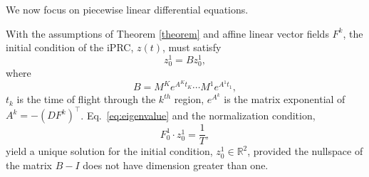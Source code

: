 \documentclass[12pt]{article}
\begin{document}
We now focus on piecewise linear differential equations.


\begin{corollary}
With the assumptions of Theorem \ref{theorem} and affine linear vector fields $F^k$, the initial condition of the iPRC, $z(t)$, must satisfy
 \begin{equation}\label{eq:eigenvalue}
z^1_0=B z^1_0,
\end{equation}
where
\begin{equation}
B=M^{K}e^{A^{K}t_K}\cdots M^1e^{A^1 t_1},
\end{equation}
$t_k$ is the time of flight through the $k^{th}$ region, $e^{A^{k}}$ is the matrix exponential of $A^k = -\left(DF^k\right)^\intercal$.  Eq.~\eqref{eq:eigenvalue} and the normalization condition,
 \begin{equation}\label{eq:normalization}
F_0^1\cdot z^1_0=\frac{1}{T},
\end{equation}
yield a unique solution for the initial condition, $z_0^1 \in \mathbb{R}^2$, provided the nullspace of the matrix $B-I$ does not have dimension greater than one.
\label{corl:circuit}\end{corollary}

\end{document}
